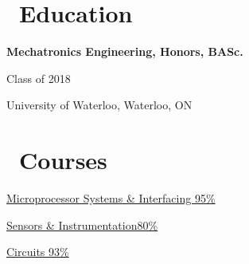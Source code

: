 \documentclass{resume}
\begin{document}
\begin{multicols}{2}

\section{\faGraduationCap\ Education}
\textbf{Mechatronics Engineering, Honors, BASc.}\par
Class of 2018\par
University of Waterloo, Waterloo, ON

\columnbreak

\section{\faBook\ Courses}

\href{http://www.ucalendar.uwaterloo.ca/1516/COURSE/course-MTE.html#MTE341}{Microprocessor Systems \& Interfacing \hfill 95\%} \par
\href{http://www.ucalendar.uwaterloo.ca/1516/COURSE/course-MTE.html#MTE220}{Sensors \& Instrumentation\hfill 80\%}\par
\href{http://www.ucalendar.uwaterloo.ca/1516/COURSE/course-MTE.html#MTE120}{Circuits \hfill 93\%}

\end{multicols}
\end{document}
